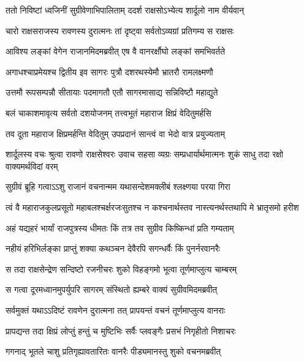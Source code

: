 
\twolineshloka
{ततो निविष्टां ध्वजिनीं सुग्रीवेणाभिपालिताम्}
{ददर्श राक्षसोऽभ्येत्य शार्दूलो नाम वीर्यवान्} %

\twolineshloka
{चारो राक्षसराजस्य रावणस्य दुरात्मनः}
{तां दृष्ट्वा सर्वतोऽव्यग्रां प्रतिगम्य स राक्षसः} %

\twolineshloka
{आविश्य लङ्कां वेगेन राजानमिदमब्रवीत्}
{एष वै वानरर्क्षौघो लङ्कां समभिवर्तते} %

\twolineshloka
{अगाधश्चाप्रमेयश्च द्वितीय इव सागरः}
{पुत्रौ दशरथस्येमौ भ्रातरौ रामलक्ष्मणौ} %

\twolineshloka
{उत्तमौ रूपसम्पन्नौ सीतायाः पदमागतौ}
{एतौ सागरमासाद्य सन्निविष्टौ महाद्युते} %

\twolineshloka
{बलं चाकाशमावृत्य सर्वतो दशयोजनम्}
{तत्त्वभूतं महाराज क्षिप्रं वेदितुमर्हसि} %

\twolineshloka
{तव दूता महाराज क्षिप्रमर्हन्ति वेदितुम्}
{उपप्रदानं सान्त्वं वा भेदो वात्र प्रयुज्यताम्} %

\threelineshloka
{शार्दूलस्य वचः श्रुत्वा रावणो राक्षसेश्वरः}
{उवाच सहसा व्यग्रः सम्प्रधार्यार्थमात्मनः}
{शुकं साधु तदा रक्षो वाक्यमर्थविदां वरम्} %

\twolineshloka
{सुग्रीवं ब्रूहि गत्वाऽऽशु राजानं वचनान्मम}
{यथासन्देशमक्लीबं श्लक्ष्णया परया गिरा} %

\twolineshloka
{त्वं वै महाराजकुलप्रसूतो महाबलश्चर्क्षरजःसुतश्च}
{न कश्चनार्थस्तव नास्त्यनर्थस्तथापि मे भ्रातृसमो हरीश} %

\twolineshloka
{अहं यद्यहरं भार्यां राजपुत्रस्य धीमतः}
{किं तत्र तव सुग्रीव किष्किन्धां प्रति गम्यताम्} %

\twolineshloka
{नहीयं हरिभिर्लङ्का प्राप्तुं शक्या कथञ्चन}
{देवैरपि सगन्धर्वैः किं पुनर्नरवानरैः} %

\twolineshloka
{स तदा राक्षसेन्द्रेण सन्दिष्टो रजनीचरः}
{शुको विहङ्गमो भूत्वा तूर्णमाप्लुत्य चाम्बरम्} %

\twolineshloka
{स गत्वा दूरमध्वानमुपर्युपरि सागरम्}
{संस्थितो ह्यम्बरे वाक्यं सुग्रीवमिदमब्रवीत्} %

\twolineshloka
{सर्वमुक्तं यथाऽऽदिष्टं रावणेन दुरात्मना}
{तत् प्रापयन्तं वचनं तूर्णमाप्लुत्य वानराः} %

\twolineshloka
{प्रापद्यन्त तदा क्षिप्रं लोप्तुं हन्तुं च मुष्टिभिः}
{सर्वैः प्लवङ्गैः प्रसभं निगृहीतो निशाचरः} %

\twolineshloka
{गगनाद् भूतले चाशु प्रतिगृह्यावतारितः}
{वानरैः पीड्यमानस्तु शुको वचनमब्रवीत्} %

